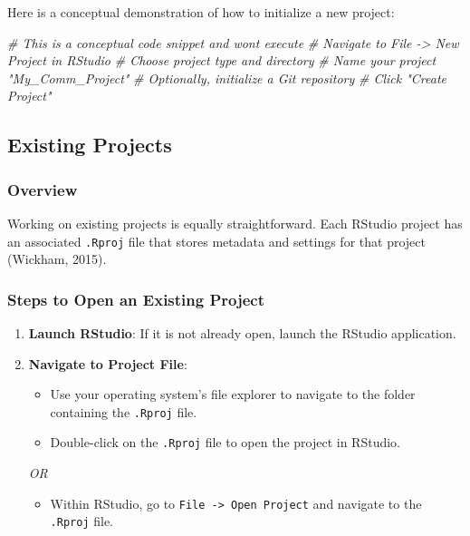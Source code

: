 \documentclass[
  b5paper]{book}
\newenvironment{Shaded}{\begin{snugshade}}{\end{snugshade}}
\newcommand{\CommentTok}[1]{\textcolor[rgb]{0.56,0.35,0.01}{\textit{#1}}}
\providecommand{\tightlist}{%
  \setlength{\itemsep}{0pt}\setlength{\parskip}{0pt}}
\begin{document}
Here is a conceptual demonstration of how to initialize a new project:

\begin{Shaded}
\begin{Highlighting}[]
\CommentTok{\# This is a conceptual code snippet and won\textquotesingle{}t execute}
\CommentTok{\# Navigate to File {-}\textgreater{} New Project in RStudio}
\CommentTok{\# Choose project type and directory}
\CommentTok{\# Name your project "My\_Comm\_Project"}
\CommentTok{\# Optionally, initialize a Git repository}
\CommentTok{\# Click "Create Project"}
\end{Highlighting}
\end{Shaded}

\hypertarget{existing-projects}{%
\subsection*{Existing Projects}\label{existing-projects}}

\hypertarget{overview-9}{%
\subsubsection*{Overview}\label{overview-9}}

Working on existing projects is equally straightforward. Each RStudio project has an associated \texttt{.Rproj} file that stores metadata and settings for that project (Wickham, 2015).

\hypertarget{steps-to-open-an-existing-project}{%
\subsubsection*{Steps to Open an Existing Project}\label{steps-to-open-an-existing-project}}

\begin{enumerate}
\def\labelenumi{\arabic{enumi}.}
\item
  \textbf{Launch RStudio}: If it is not already open, launch the RStudio application.
\item
  \textbf{Navigate to Project File}:

  \begin{itemize}
  \tightlist
  \item
    Use your operating system's file explorer to navigate to the folder containing the \texttt{.Rproj} file.
  \item
    Double-click on the \texttt{.Rproj} file to open the project in RStudio.
  \end{itemize}

  \emph{OR}

  \begin{itemize}
  \tightlist
  \item
    Within RStudio, go to \texttt{File\ -\textgreater{}\ Open\ Project} and navigate to the \texttt{.Rproj} file.
  \end{itemize}
\end{enumerate}
\end{document}

